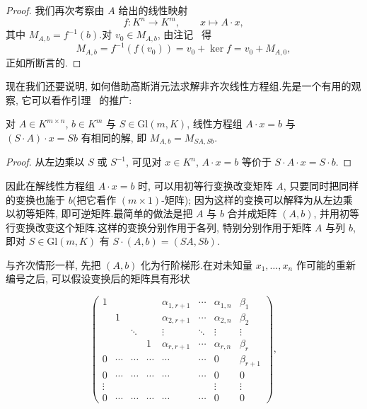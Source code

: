 \begin{proof}
我们再次考察由 $A$ 给出的线性映射
\[
f \colon K^n \longrightarrow K^m, \qquad x \longmapsto A \cdot x,
\]
其中 $M_{A, b} = f^{-1}(b)$.对 $v_0 \in M_{A, b}$, 由注记~ 得
\[
M_{A, b} = f^{-1}\left(f(v_0)\right) = v_0 + \ker f = v_0 + M_{A, 0},
\]
正如所断言的.
\end{proof}

现在我们还要说明, 如何借助高斯消元法求解非齐次线性方程组.先是一个有用的观察, 它可以看作引理~ 的推广:

\begin{lemma}\label{lem:3.5.8}
对 $A \in K^{m \times n}$, $b \in K^m$ 与 $S \in \mathrm{Gl}(m, K)$, 线性方程组 $A \cdot x = b$ 与 $(S \cdot A) \cdot x = Sb$ 有相同的解, 即 $M_{A, b} = M_{SA, Sb}$.
\end{lemma}

\begin{proof}
从左边乘以 $S$ 或 $S^{-1}$, 可见对 $x \in K^n$, $A \cdot x = b$ 等价于 $S \cdot A \cdot x = S \cdot b$.
\end{proof}

因此在解线性方程组 $A \cdot x = b$ 时, 可以用初等行变换改变矩阵 $A$, 只要同时把同样的变换也施于 $b$(把它看作 $(m \times 1)$-矩阵); 因为这样的变换可以解释为从左边乘以初等矩阵, 即可逆矩阵.最简单的做法是把 $A$ 与 $b$ 合并成矩阵 $(A, b)$, 并用初等行变换改变这个矩阵.这样的变换分别作用于各列, 特别分别作用于矩阵 $A$ 与列 $b$, 即对 $S \in \mathrm{Gl}(m, K)$ 有 $S \cdot (A, b) = (SA, Sb)$.

与齐次情形一样, 先把 $(A, b)$ 化为行阶梯形.在对未知量 $x_1, \ldots, x_n$ 作可能的重新编号之后, 可以假设变换后的矩阵具有形状

\[
\begin{pmatrix}
1 & & & & \alpha_{1, r + 1} & \cdots & \alpha_{1, n} & \beta_1 \\
& 1 & & & \alpha_{2, r + 1} & \cdots & \alpha_{2, n} & \beta_2 \\
& & \ddots & & \vdots & \ddots & \vdots & \vdots \\
& & & 1 & \alpha_{r, r + 1} & \cdots & \alpha_{r, n} & \beta_r \\
0 & \cdots & \cdots & \cdots & \cdots & \cdots & 0 & \beta_{r + 1} \\
0 & \cdots & \cdots & \cdots & \cdots & \cdots & 0 & 0 \\
\vdots & & & & & & \vdots & \vdots \\
0 & \cdots & \cdots & \cdots & \cdots & \cdots & 0 & 0
\end{pmatrix},
\]


